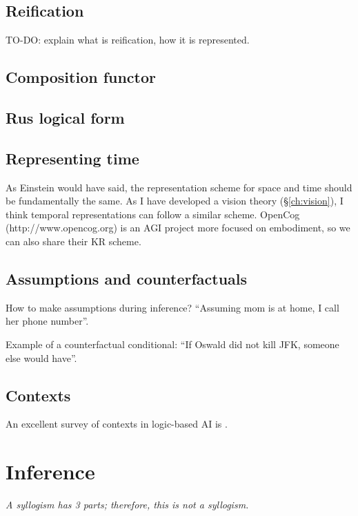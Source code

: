 \documentclass[a4paper]{report}
\begin{document}
\section{Reification}
\label{sec:reification}

TO-DO:  explain what is reification, how it is represented.

\section{Composition functor}
\label{sec:CompositionFunctor}

\section{Rus logical form}
\label{sec:Rus-logical-form}

\section{Representing time}

As Einstein would have said, the representation scheme for space and time should be fundamentally the same.  As I have developed a vision theory (\S\ref{ch:vision}), I think temporal representations can follow a similar scheme.  OpenCog (http://www.opencog.org) is an AGI project more focused on embodiment, so we can also share their KR scheme.

\section{Assumptions and counterfactuals}

How to make assumptions during inference?  ``Assuming mom is at home, I call her phone number''.

Example of a counterfactual conditional:  ``If Oswald did not kill JFK, someone else would have''.

\section{Contexts}

An excellent survey of contexts in logic-based AI is \citep*{Akman1996}.



\chapter{Inference}
\label{ch:inference}
\begin{flushright}
\emph{A syllogism has 3 parts; therefore, this is not a syllogism.}
\end{flushright}
\minitoc
\end{document}
